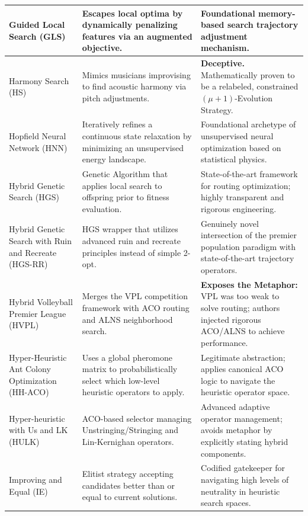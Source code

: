 \begin{center}
\begin{longtable}{
  >{\raggedright\arraybackslash}p{}
  >{\raggedright\arraybackslash}p{}
  >{\raggedright\arraybackslash}p{}
}
Guided Local Search (GLS) & Escapes local optima by dynamically penalizing features via an augmented objective. & Foundational memory-based search trajectory adjustment mechanism. \\ \midrule

Harmony Search (HS) & Mimics musicians improvising to find acoustic harmony via pitch adjustments. & \textbf{Deceptive.} Mathematically proven to be a relabeled, constrained $(\mu + 1)$-Evolution Strategy. \\ \midrule

Hopfield Neural Network (HNN) & Iteratively refines a continuous state relaxation by minimizing an unsupervised energy landscape. & Foundational archetype of unsupervised neural optimization based on statistical physics. \\ \midrule

Hybrid Genetic Search (HGS) & Genetic Algorithm that applies local search to offspring prior to fitness evaluation. & State-of-the-art framework for routing optimization; highly transparent and rigorous engineering. \\ \midrule

Hybrid Genetic Search with Ruin and Recreate (HGS-RR) & HGS wrapper that utilizes advanced ruin and recreate principles instead of simple 2-opt. & Genuinely novel intersection of the premier population paradigm with state-of-the-art trajectory operators. \\ \midrule

Hybrid Volleyball Premier League (HVPL) & Merges the VPL competition framework with ACO routing and ALNS neighborhood search. & \textbf{Exposes the Metaphor:} VPL was too weak to solve routing; authors injected rigorous ACO/ALNS to achieve performance. \\ \midrule

Hyper-Heuristic Ant Colony Optimization (HH-ACO) & Uses a global pheromone matrix to probabilistically select which low-level heuristic operators to apply. & Legitimate abstraction; applies canonical ACO logic to navigate the heuristic operator space. \\ \midrule

Hyper-heuristic with Us and LK (HULK) & ACO-based selector managing Unstringing/Stringing and Lin-Kernighan operators. & Advanced adaptive operator management; avoids metaphor by explicitly stating hybrid components. \\ \midrule

Improving and Equal (IE) & Elitist strategy accepting candidates better than or equal to current solutions. & Codified gatekeeper for navigating high levels of neutrality in heuristic search spaces. \\ \midrule


\end{longtable}
\end{center}
